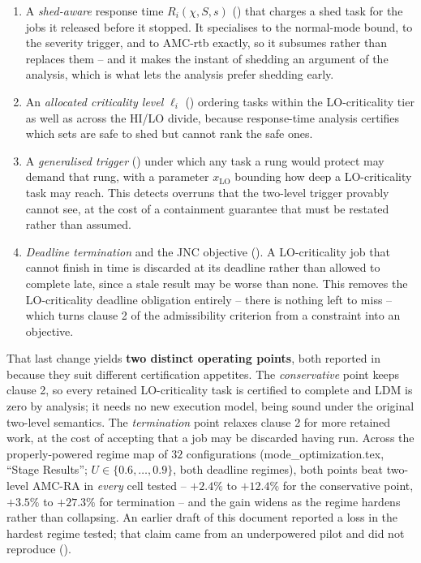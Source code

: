 \begin{enumerate}
\item A \emph{shed-aware} response time $R_i(\chi, S, s)$
  () that charges a shed task for the jobs it released
  before it stopped. It specialises to the normal-mode bound, to the severity
  trigger, and to AMC-rtb exactly, so it subsumes rather than replaces them --
  and it makes the instant of shedding an argument of the analysis, which is
  what lets the analysis prefer shedding early.
\item An \emph{allocated criticality level} $\ell_i$
  () ordering tasks within the LO-criticality tier
  as well as across the HI/LO divide, because response-time analysis certifies
  which sets are safe to shed but cannot rank the safe ones.
\item A \emph{generalised trigger} () under which any task
  a rung would protect may demand that rung, with a parameter
  $x_{\mathrm{LO}}$ bounding how deep a LO-criticality task may reach. This
  detects overruns that the two-level trigger provably cannot see, at the cost
  of a containment guarantee that must be restated rather than assumed.
\item \emph{Deadline termination} and the JNC objective
  (). A LO-criticality job that cannot
  finish in time is discarded at its deadline rather than allowed to complete
  late, since a stale result may be worse than none. This removes the
  LO-criticality deadline obligation entirely -- there is nothing left to miss
  -- which turns clause 2 of the admissibility criterion from a constraint into
  an objective.
\end{enumerate}

That last change yields \textbf{two distinct operating points}, both reported
in  because they suit different certification
appetites. The \emph{conservative} point keeps clause 2, so every retained
LO-criticality task is certified to complete and LDM is zero by analysis; it
needs no new execution model, being sound under the original two-level
semantics. The \emph{termination} point relaxes clause 2 for more retained
work, at the cost of accepting that a job may be discarded having run. Across
the properly-powered regime map of $32$ configurations
(mode\_optimization.tex, ``Stage Results''; $U \in \{0.6,\ldots,0.9\}$, both
deadline regimes), both points beat two-level AMC-RA in \emph{every} cell
tested -- $+2.4\%$ to $+12.4\%$ for the conservative point, $+3.5\%$ to
$+27.3\%$ for termination -- and the gain widens as the regime hardens rather
than collapsing. An earlier draft of this document reported a loss in the
hardest regime tested; that claim came from an underpowered pilot and did not
reproduce ().

